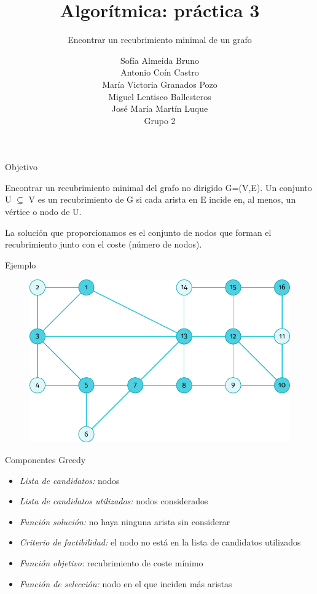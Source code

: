 \documentclass[spanish]{beamer}
\title{Algorítmica: práctica 3}
\subtitle{Encontrar un recubrimiento minimal de un grafo}
\author{Sofía Almeida Bruno\\ Antonio Coín Castro\\ María Victoria Granados Pozo\\ Miguel Lentisco Ballesteros\\ José María Martín Luque\\ \vspace{1em}Grupo 2}
\begin{document}
\maketitle

\begin{frame}{Objetivo}
	
	Encontrar un recubrimiento minimal del grafo no dirigido G=(V,E).
	Un conjunto U $\subseteq$ V es un recubrimiento de G si cada arista en E incide en, al menos, un vértice o nodo de U.
	
	La solución que proporcionamos es el conjunto de nodos que forman el recubrimiento junto con el coste (número de nodos). 
\end{frame}

\begin{frame}{Ejemplo}
	\begin{figure}[H]
		\centering \includegraphics{./img/grafo.pdf}
	\end{figure}
\end{frame}

\begin{frame}{Componentes Greedy}
	\begin{itemize}
		\item \textit{Lista de candidatos:} nodos
		\item \textit{Lista de candidatos utilizados:} nodos considerados
		\item \textit{Función solución:} no haya ninguna arista sin considerar %
		\item \textit{Criterio de factibilidad:} el nodo no está en la lista de candidatos utilizados
		\item \textit{Función objetivo:} recubrimiento de coste mínimo
		\item \textit{Función de selección:} nodo en el que inciden más aristas
		
	\end{itemize}
\end{frame}
\end{document}
